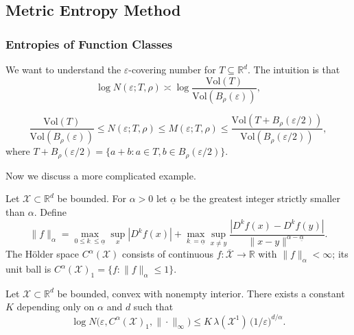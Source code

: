 \subsection{Metric Entropy Method}
\subsubsection{Entropies of Function Classes}
We want to understand the $\varepsilon$-covering number for $T \subseteq \mathbb{R}^d$. The intuition is that
\[
\log N(\varepsilon; T, \rho) \asymp \log \frac{\mathrm{Vol}(T)}{\mathrm{Vol}(B_\rho(\varepsilon))},
\]
\begin{lem}
\[
\frac{\mathrm{Vol}(T)}{\mathrm{Vol}(B_\rho(\varepsilon))} \leq N(\varepsilon; T, \rho) \leq M(\varepsilon; T, \rho) \leq \frac{\mathrm{Vol}(T + B_\rho(\varepsilon/2))}{\mathrm{Vol}(B_\rho(\varepsilon/2))},
\]
where $T + B_\rho(\varepsilon/2) = \{a + b : a \in T, b \in B_\rho(\varepsilon/2)\}$.
\end{lem}

Now we discuss a more complicated example.
\begin{defn}
Let $\mathcal{X}\subset\mathbb{R}^d$ be bounded. For $\alpha>0$ let $\underline{\alpha}$ be the
greatest integer strictly smaller than $\alpha$. Define
\[
\|f\|_\alpha = \max_{0\le k_\cdot\le\underline\alpha}\sup_x |D^k f(x)|
+ \max_{k_\cdot=\underline\alpha}\sup_{x\ne y}
\frac{|D^k f(x)-D^k f(y)|}{\|x-y\|^{\alpha-\underline\alpha}}.
\]
The H\"older space $C^\alpha(\mathcal{X})$ consists of continuous
$f:\overline{\mathcal{X}}\to\mathbb{R}$
with $\|f\|_\alpha<\infty$; its unit ball is $C^\alpha(\mathcal{X})_1=\{f:\|f\|_\alpha\le 1\}$.
\end{defn}

\begin{thm}
Let $\mathcal{X}\subset\mathbb{R}^d$ be bounded, convex with nonempty interior. There exists a
constant $K$ depending only on $\alpha$ and $d$ such that
\[
\log N\bigl(\varepsilon, C^\alpha(\mathcal{X})_1, \|\cdot\|_\infty\bigr)
\le K\,\lambda(\mathcal{X}^1)\,\bigl(1/\varepsilon\bigr)^{d/\alpha}.
\]
\end{thm}

